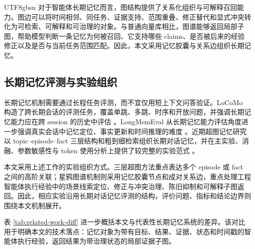 \documentclass[a4paper,fleqn]{cas-sc}
\begin{document}
\begin{CJK*}{UTF8}{gbsn}
对于智能体长期记忆而言，图结构提供了关系化组织与可解释召回能力。图边可以将时间相邻、同任务、证据支持、范围重叠、修正替代和显式冲突转化为可检索、可解释和可治理的对象。与普通向量库相比，图谱能够返回局部子图，帮助模型判断一条记忆为何被召回、它支持哪些 claims、是否被后来的经验修正以及是否与当前任务范围匹配。因此，本文采用记忆胶囊与关系边组织长期记忆。

\subsection{长期记忆评测与实验组织}

长期记忆机制需要通过长程任务评测，而不宜仅用短上下文问答验证。LoCoMo 构造了跨长期会话的评测任务，覆盖单跳、多跳、时序和开放问题，并强调长期记忆能力应在跨 session 的历史中评估 \citep{maharana2024locomo}。LongMemEval 从长期记忆能力评估角度进一步强调真实会话中记忆定位、事实更新和时间推理的难度 \citep{wu2024longmemeval}。近期超图记忆研究以 topic--episode--fact 三层结构和粗到细检索组织长期对话记忆，并在主实验、消融、参数敏感性与 token 使用分析上提供了较完整的实验范式 \citep{yue2026hypermem}。

本文采用上述工作的实验组织方式。三层超图方法重点表达多个 episode 或 fact 之间的高阶关联；星鸦图谱机制则采用记忆胶囊节点和成对关系边，重点处理工程智能体执行经验中的场景线索定位、修正与冲突治理、陈旧抑制和可解释子图返回。因此，相应实验沿用长期对话记忆评测的结构，评价问题、指标和结论边界则围绕本文机制展开。

表 \ref{tab:related-work-diff} 进一步概括本文与代表性长期记忆系统的差异。该对比用于明确本文的技术落点：记忆对象为带有目标、结果、证据、状态和时间戳的智能体执行经验，返回结果为带治理状态的局部证据子图。


\end{CJK*}
\end{document}
